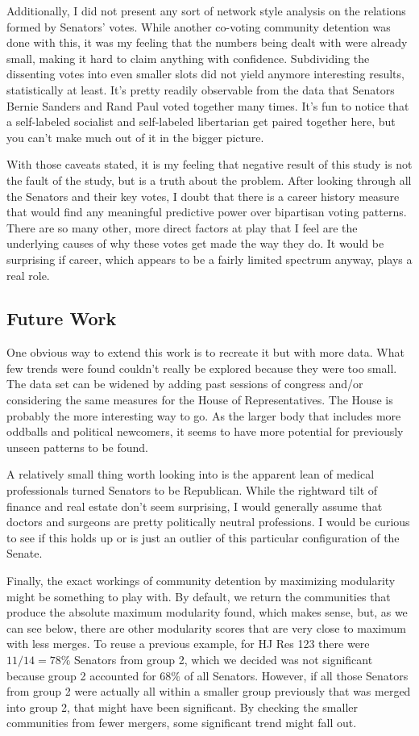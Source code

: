 \documentclass[11pt,twocolumn]{article}
\begin{document}
	Additionally, I did not present any sort of network style analysis on the relations formed by Senators' votes. While another co-voting community detention was done with this, it was my feeling that the numbers being dealt with were already small, making it hard to claim anything with confidence. Subdividing the dissenting votes into even smaller slots did not yield anymore interesting results, statistically at least. It's pretty readily observable from the data that Senators Bernie Sanders and Rand Paul voted together many times. It's fun to notice that a self-labeled socialist and self-labeled libertarian get paired together here, but you can't make much out of it in the bigger picture.
	
	With those caveats stated, it is my feeling that negative result of this study is not the fault of the study, but is a truth about the problem. After looking through all the Senators and their key votes, I doubt that there is a career history measure that would find any meaningful predictive power over bipartisan voting patterns. There are so many other, more direct factors at play that I feel are the underlying causes of why these votes get made the way they do. It would be surprising if career, which appears to be a fairly limited spectrum anyway, plays a real role.
	
	\subsection{Future Work}
	One obvious way to extend this work is to recreate it but with more data. What few trends were found couldn't really be explored because they were too small. The data set can be widened by adding past sessions of congress and/or considering the same measures for the House of Representatives. The House is probably the more interesting way to go. As the larger body that includes more oddballs and political newcomers, it seems to have more potential for previously unseen patterns to be found.
	
	A relatively small thing worth looking into is the apparent lean of medical professionals turned Senators to be Republican. While the rightward tilt of finance and real estate don't seem surprising, I would generally assume that doctors and surgeons are pretty politically neutral professions. I would be curious to see if this holds up or is just an outlier of this particular configuration of the Senate.
	
	Finally, the exact workings of community detention by maximizing modularity might be something to play with. By default, we return the communities that produce the absolute maximum modularity found, which makes sense, but, as we can see below, there are other modularity scores that are very close to maximum with less merges. To reuse a previous example, for HJ Res 123 there were $11/14 = 78\%$ Senators from group 2, which we decided was not significant because group 2 accounted for $68\%$ of all Senators. However, if all those Senators from group 2 were actually all within a smaller group previously that was merged into group 2, that might have been significant. By checking the smaller communities from fewer mergers, some significant trend might fall out.
		
\end{document}
